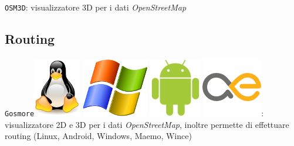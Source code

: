 \documentclass[a4paper,twoside,12pt,]{article}
\newcommand{\osm}{\emph{OpenStreetMap}\xspace}
\newcommand{\soft}[1]{\texttt{#1}}
\begin{document}
\soft{OSM3D}: visualizzatore 3D per i dati \osm

\subsection{Routing}
\soft{Gosmore}\includegraphics{./linux-logo.jpg} \includegraphics{./windows-logo.jpg} \includegraphics{./android-logo.jpg}  \includegraphics{./maemo-logo.png}: visualizzatore 2D e 3D per i dati \osm, inoltre permette di effettuare routing (Linux, Android, Windows, Maemo, Wince)
\end{document}
